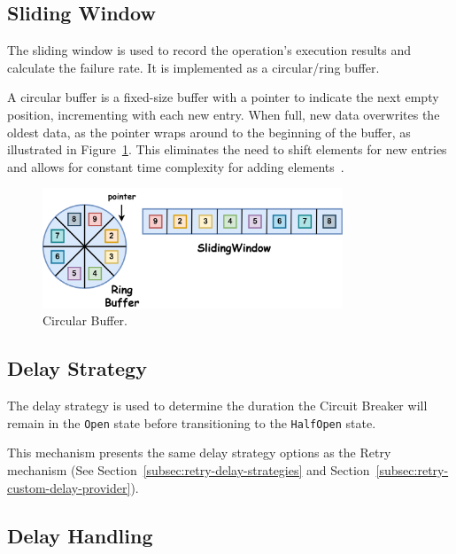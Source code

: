 \subsection{Sliding Window}\label{subsec:cbreaker-sliding-window}

The sliding window is used to record the operation's execution results and calculate the failure rate.
It is implemented as a circular/ring buffer.

A circular buffer is a fixed-size buffer with a pointer to indicate the next empty position, incrementing with each new entry.
When full, new data overwrites the oldest data, as the pointer wraps around to the beginning of the buffer, as illustrated in Figure~\ref{fig:05_circular-buffer}.
This eliminates the need to shift elements for new entries and allows for constant time complexity for adding elements~\cite{circular-buffer}.

\begin{figure}[!htb]
    \centering
    \includegraphics[width=0.8\textwidth]{../figures/05_circular-buffer}
    \caption{Circular Buffer.}
    \label{fig:05_circular-buffer}
\end{figure}

\subsection{Delay Strategy}\label{subsec:cbreaker-delay-strategy}

The delay strategy is used
to determine the duration the Circuit Breaker will remain in the \texttt{Open} state before transitioning to the \texttt{HalfOpen} state.

This mechanism presents the same delay strategy options as the Retry mechanism (See Section~\ref{subsec:retry-delay-strategies} and Section~\ref{subsec:retry-custom-delay-provider}).

\subsection{Delay Handling}\label{subsec:cbreaker-delay-handling}

